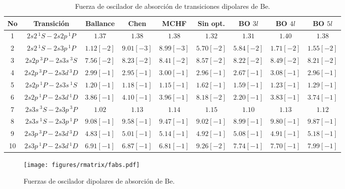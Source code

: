 \begin{table}
\begin{adjustwidth}{-.6in}{-.6in}  
\centering
\begin{tabular}{|*{9}{c|}} 
\hline 
No & Transición                & Ballance   & Chen       & MCHF       & Sin opt.   & BO $3l$    & BO $4l$  & BO $5l$ \\
\hline
\hline
1  & $2s2  \,^1S - 2s2p \,^1P$ & $1.37$     & $1.38$     & $1.38    $ & $1.32    $ & $1.31    $ & $1.40    $ & $1.38$ \\
2  & $2s2  \,^1S - 2s3p \,^1P$ & $1.12[-2]$ & $9.01[-3]$ & $8.99[-3]$ & $5.70[-2]$ & $5.84[-2]$ & $1.71[-2]$ & $1.55[-2]$ \\
3  & $2s2p \,^3P - 2s3s \,^3S$ & $7.56[-2]$ & $8.23[-2]$ & $8.41[-2]$ & $8.57[-2]$ & $8.22[-2]$ & $8.49[-2]$ & $8.21[-2]$ \\
4  & $2s2p \,^3P - 2s3d \,^3D$ & $2.99[-1]$ & $2.95[-1]$ & $3.00[-1]$ & $2.96[-1]$ & $2.67[-1]$ & $3.08[-1]$ & $2.96[-1]$ \\
5  & $2s2p \,^1P - 2s3s \,^1S$ & $1.20[-1]$ & $1.18[-1]$ & $1.15[-1]$ & $1.62[-1]$ & $1.59[-1]$ & $1.23[-1]$ & $1.29[-1]$ \\
6  & $2s2p \,^1P - 2s3d \,^1D$ & $3.86[-1]$ & $4.10[-1]$ & $3.96[-1]$ & $8.18[-2]$ & $2.20[-1]$ & $3.83[-1]$ & $3.74[-1]$ \\
7  & $2s3s \,^3S - 2s3p \,^3P$ & $1.02$     & $1.13    $ & $1.14    $ & $1.15    $ & $1.10$     & $1.13    $ & $1.12$ \\
8  & $2s3s \,^1S - 2s3p \,^1P$ & $9.08[-1]$ & $9.58[-1]$ & $9.47[-1]$ & $9.02[-1]$ & $8.99[-1]$ & $9.80[-1]$ & $9.87[-1]$ \\
9  & $2s3p \,^3P - 2s3d \,^3D$ & $4.83[-1]$ & $5.01[-1]$ & $5.14[-1]$ & $4.92[-1]$ & $5.08[-1]$ & $4.91[-1]$ & $5.18[-1]$ \\
10 & $2s3p \,^1P - 2s3d \,^1D$ & $6.91[-1]$ & $6.87[-1]$ & $6.81[-1]$ & $9.26[-2]$ & $7.74[-1]$ & $7.70[-1]$ & $7.99[-1]$ \\
\hline
\end{tabular}
\caption{Fuerza de oscilador de absorción de transiciones dipolares de Be.}
\label{tab:fabs}
\end{adjustwidth}
\end{table}

\begin{figure}[H]
\centering
\texttt{[image: figures/rmatrix/fabs.pdf]} 
\caption{Fuerzas de oscilador dipolares de absorción de Be.}
\label{fig:fabs}
\end{figure}

